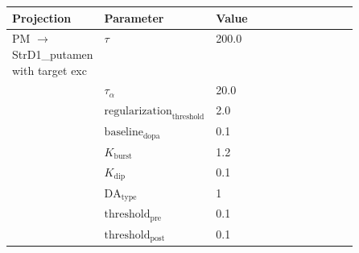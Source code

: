 \documentclass{article}
\begin{document}
\vspace{2ex}

\noindent
\begin{tabularx}{\linewidth}{|p{0.25\linewidth}|p{0.25\linewidth}|X|}\hline
\textbf{Projection} & \textbf{Parameter} & \textbf{Value}   \\ \hline

    PM  $\rightarrow$ StrD1\_putamen with target exc & $\tau$        & 200.0  \\ \hline

     & $\tau_\alpha$        & 20.0  \\ \hline

     & ${\text{regularization}}_{\text{threshold}}$        & 2.0  \\ \hline

     & ${\text{baseline}}_{\text{dopa}}$        & 0.1  \\ \hline

     & $K_{\text{burst}}$        & 1.2  \\ \hline

     & $K_{\text{dip}}$        & 0.1  \\ \hline

     & ${\text{DA}}_{\text{type}}$        & 1  \\ \hline

     & ${\text{threshold}}_{\text{pre}}$        & 0.1  \\ \hline

     & ${\text{threshold}}_{\text{post}}$        & 0.1  \\ \hline

\end{tabularx}

\vspace{2ex}
\end{document}
